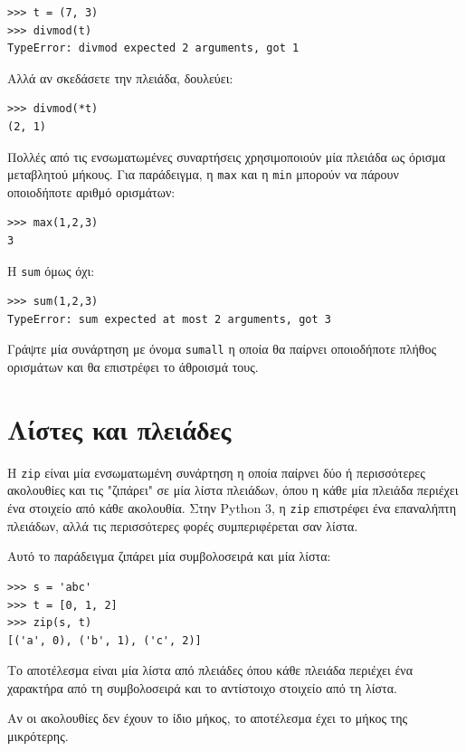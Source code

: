 \documentclass[10pt]{book}
\begin{document}
\begin{verbatim}
>>> t = (7, 3)
>>> divmod(t)
TypeError: divmod expected 2 arguments, got 1
\end{verbatim}
%
Αλλά αν σκεδάσετε την πλειάδα, δουλεύει:

\begin{verbatim}
>>> divmod(*t)
(2, 1)
\end{verbatim}
%
\begin{exercise}

Πολλές από τις ενσωματωμένες συναρτήσεις χρησιμοποιούν μία πλειάδα ως όρισμα μεταβλητού μήκους. Για παράδειγμα, η {\tt max} και η {\tt min} μπορούν να πάρουν οποιοδήποτε αριθμό ορισμάτων:

\begin{verbatim}
>>> max(1,2,3)
3
\end{verbatim}
%
Η {\tt sum} όμως όχι:

\begin{verbatim}
>>> sum(1,2,3)
TypeError: sum expected at most 2 arguments, got 3
\end{verbatim}
%
Γράψτε μία συνάρτηση με όνομα {\tt sumall} η οποία θα παίρνει οποιοδήποτε πλήθος ορισμάτων και θα επιστρέφει το άθροισμά τους.
\end{exercise}


\section{Λίστες και πλειάδες}

Η {\tt zip} είναι μία ενσωματωμένη συνάρτηση η οποία παίρνει δύο ή περισσότερες ακολουθίες και τις "ζιπάρει" σε μία λίστα πλειάδων, όπου η κάθε μία πλειάδα περιέχει ένα στοιχείο από κάθε ακολουθία. Στην Python 3, η {\tt zip} επιστρέφει ένα επαναλήπτη πλειάδων, αλλά τις περισσότερες φορές συμπεριφέρεται σαν λίστα.

Αυτό το παράδειγμα ζιπάρει μία συμβολοσειρά και μία λίστα:

\begin{verbatim}
>>> s = 'abc'
>>> t = [0, 1, 2]
>>> zip(s, t)
[('a', 0), ('b', 1), ('c', 2)]
\end{verbatim}
%
Το αποτέλεσμα είναι μία λίστα από πλειάδες όπου κάθε πλειάδα περιέχει ένα χαρακτήρα από τη συμβολοσειρά και το αντίστοιχο στοιχείο από τη λίστα.

Αν οι ακολουθίες δεν έχουν το ίδιο μήκος, το αποτέλεσμα έχει το μήκος της μικρότερης.
\end{document}

